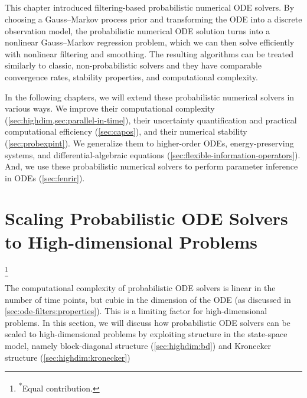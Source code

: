 \documentclass{mimosis}
\begin{document}
\section{\wrapupsec{}}
\label{sec:org9cc6d9a}
This chapter introduced filtering-based probabilistic numerical ODE solvers.
By choosing a Gauss--Markov process prior and transforming the ODE into a discrete observation model, the probabilistic numerical ODE solution turns into a nonlinear Gauss--Markov regression problem, which we can then solve efficiently with nonlinear filtering and smoothing.
The resulting algorithms can be treated similarly to classic, non-probabilistic solvers and they have comparable convergence rates, stability properties, and computational complexity.

In the following chapters, we will extend these probabilistic numerical solvers in various ways.
We improve their computational complexity
(\cref{sec:highdim,sec:parallel-in-time}),
their uncertainty quantification and practical computational efficiency  (\cref{sec:capos}),
and their numerical stability (\cref{sec:probexpint}).
We generalize them to higher-order ODEs, energy-preserving systems, and differential-algebraic equations (\cref{sec:flexible-information-operators}).
And, we use these probabilistic numerical solvers to perform parameter inference in ODEs (\cref{sec:fenrir}).
\chapter{Scaling Probabilistic ODE Solvers to High-dimensional Problems}
\label{sec:org5dea8c9}
\label{sec:ode-filter-complexity}
\label{sec:highdim}

{\let\thefootnote\relax\footnote{\textsuperscript{*}Equal contribution.}}

The computational complexity of probabilistic ODE solvers is linear in the number of time points, but cubic in the dimension of the ODE
(as discussed in \cref{sec:ode-filters:properties}).
This is a limiting factor for high-dimensional problems.
In this section, we will discuss how probabilistic ODE solvers can be scaled to high-dimensional problems by exploiting structure in the state-space model,
namely block-diagonal structure
(\cref{sec:highdim:bd})
and Kronecker structure
(\cref{sec:highdim:kronecker})
\end{document}
